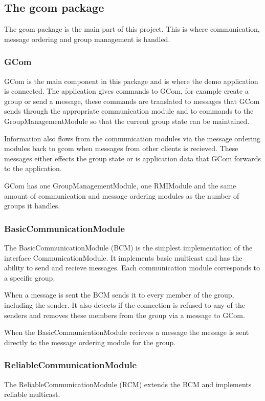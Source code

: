 \documentclass[english]{article}
\begin{document}
\subsection{The gcom package}
The gcom package is the main part of this project. This is where communication, message ordering and group management is handled. 

\subsubsection{GCom}
GCom is the main component in this package and is where the demo application is connected. The application gives commands to GCom, for example create a group or send a message, these commands are translated to messages that GCom sends through the appropriate communication module and to commands to the GroupManagementModule so that the current group state can be maintained.

Information also flows from the communication modules via the message ordering modules back to gcom when messages from other clients is recieved. These messages either effects the group state or is application data that GCom forwards to the application. 

GCom has one GroupManagementModule, one RMIModule and the same amount of communication and message ordering modules as the number of groups it handles.

\subsubsection{BasicCommunicationModule}
The BasicCommunicationModule (BCM) is the simplest implementation of the interface CommunicationModule. It implements basic multicast and has the ability to send and recieve messages. Each communication module corresponds to a specific group. 

When a message is sent the BCM sends it to every member of the group, including the sender. It also detects if the connection is refused to any of the senders and removes these members from the group via a message to GCom.

When the BasicCommunicationModule recieves a message the message is sent directly to the message ordering module for the group.

\subsubsection{ReliableCommunicationModule}
The ReliableCommunicationModule (RCM) extends the BCM and implements reliable multicast.
\end{document}
